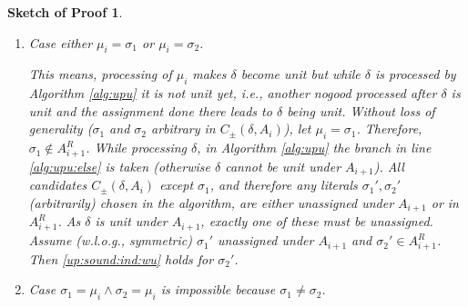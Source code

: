 \documentclass[final]{vutinfth} %
\newtheorem{proof-sketch}{Sketch of Proof}[chapter]
\newcommand{\ass}{A}
\newcommand{\cdpm}{C_\pm}
\newcommand{\sgl}{\mu}
\newcommand{\bsgl}{\sigma}
\begin{document}
\begin{proof-sketch}
\begin{enumerate}
\begin{enumerate}[label=\alph*),ref=\theenumi.\alph*]
\begin{enumerate}[label=\roman*.,ref=\theenumii.\roman*]
		$\Delta_i^\pm(\bsgl_1) = \Delta_{i+1}^\pm(\bsgl_1)$ and $\Delta_i^\pm(\bsgl_2) = \Delta_{i+1}^\pm(\bsgl_2)$, as watch sets are only modified in case $\bsgl_1 = \sgl_i$ and respectively $\bsgl_2 = \sgl_i$ (see Algorithm \ref{alg:upu}: Only nogoods that are being iterated over in line \ref{alg:upu:it} are being removed from any watch sets in line \ref{alg:upu:rm}). Both $\bsgl_1$ and $\bsgl_2$ are in $A_{i+1}^R$, because $\ass_{i}^R \setminus \{ \sgl_i \} \subseteq \ass_{i+1}^R$, thus we have \ref{up:sound:ind:wu}.
		
		\item Case either $\sgl_i = \bsgl_1$ or $\sgl_i = \bsgl_2$.
		\label{sigmaprimes}		
		
		This means, processing of $\sgl_i$ makes $\delta$ become unit but while $\delta$ is processed by Algorithm \ref{alg:upu} it is not unit yet, i.e., another nogood processed after $\delta$ is unit and the assignment done there leads to $\delta$ being unit.
		Without loss of generality ($\bsgl_1$ and $\bsgl_2$ arbitrary in $\cdpm(\delta, \ass_i)$), let $\sgl_i = \bsgl_1$. Therefore, $\bsgl_1 \not \in A_{i+1}^R$. While processing $\delta$, in Algorithm \ref{alg:upu} the branch in line \ref{alg:upu:else} is taken (otherwise $\delta$ cannot be unit under $\ass_{i+1}$). All candidates $\cdpm(\delta, \ass_i)$ except $\bsgl_1$, and therefore any literals $\bsgl_1', \bsgl_2'$ (arbitrarily) chosen in the algorithm, are either unassigned under $\ass_{i+1}$ or in $\ass_{i+1}^R$. As $\delta$ is unit under $\ass_{i+1}$, exactly one of these must be unassigned.
		Assume (w.l.o.g., symmetric) $\bsgl_1'$ unassigned under $A_{i+1}$ and $\bsgl_2' \in \ass_{i+1}^R$. Then \ref{up:sound:ind:wu} holds for $\bsgl_2'$.
		
		\item Case $\bsgl_1 = \sgl_i \wedge \bsgl_2 = \sgl_i$ is impossible because $\bsgl_1 \not = \bsgl_2$.
		\end{enumerate}
\end{enumerate}


\end{enumerate}
\end{proof-sketch}
\end{document}
